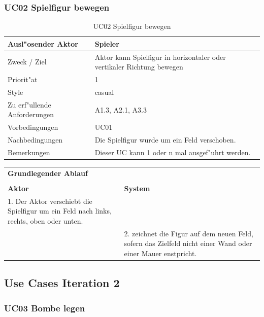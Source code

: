 \subsubsection{UC02 Spielfigur bewegen}

\begin{table}[H]
  \begin{center}
    \begin{tabular}{|p{40mm}|p{90mm}|}
    \hline Ausl"osender Aktor & Spieler \\
    \hline Zweck / Ziel & Aktor kann Spielfigur in horizontaler oder vertikaler Richtung bewegen \\
    \hline Priorit"at & 1\\
    \hline Style & casual \\
    \hline Zu erf"ullende Anforderungen & A1.3, A2.1, A3.3 \\
    \hline Vorbedingungen & UC01 \\
    \hline Nachbedingungen & Die Spielfigur wurde um ein Feld verschoben.\\
    \hline Bemerkungen & Dieser UC kann 1 oder n mal ausgef"uhrt werden. \\
    \hline
    \end{tabular}
  \end{center}
  \caption{UC02 Spielfigur bewegen}
\end{table}


\begin{center}
  \begin{tabular}{p{65mm} p{65mm}}
  \multicolumn{2}{l}{\textbf{Grundlegender Ablauf}} \\
  & \\
  \textbf{Aktor} & \textbf{System} \\
  1. Der Aktor verschiebt die Spielfigur um ein Feld nach links, rechts, oben oder unten. & \\
  & 2. zeichnet die Figur auf dem neuen Feld, sofern das Zielfeld nicht einer Wand oder einer Mauer enstpricht. \\
  \end{tabular}
\end{center}

\subsection{Use Cases Iteration 2}
\subsubsection{UC03 Bombe legen}

